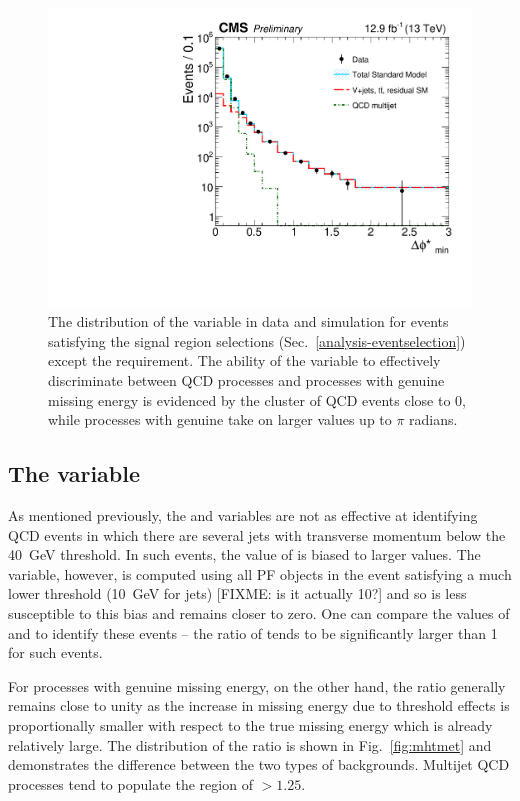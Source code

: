 
\begin{figure}[t!]
\begin{center}
\includegraphics[width=0.7\linewidth]{figs/analysis/propaganda_bdphi}
\caption{The distribution of the \bdphi variable in data and simulation for 
events satisfying the signal region selections 
(Sec.~\ref{analysis-eventselection}) except the \bdphi requirement. The ability 
of the variable to effectively discriminate between QCD processes and processes 
with genuine missing energy is evidenced by the cluster of QCD events close to 
0, while processes with genuine \met take on larger values up to $\pi$ radians.}
\label{fig:bdphi}
\end{center}
\end{figure}

\subsection{The \mhtmet variable}

As mentioned previously, the \alphat and \bdphi variables are not as effective 
at identifying QCD events in which there are several jets with transverse 
momentum below the 40~GeV threshold. In such events, the value of \mht is 
biased to larger values. The \met variable, however, is computed using all PF 
objects in the event satisfying a much lower threshold (10~GeV for jets) 
[FIXME: is it actually 10?] and so is less susceptible to this bias and remains 
closer to zero. One can compare the values of \mht and \met to identify these 
events -- the ratio of \mhtmet tends to be significantly larger than 1 for such 
events. 

For processes with genuine missing energy, on the other hand, the ratio 
generally remains close to unity as the increase in missing energy due to 
threshold effects is proportionally smaller with respect to the true missing 
energy which is already relatively large. The distribution of the \mhtmet 
ratio is shown in Fig.~\ref{fig:mhtmet} and demonstrates the difference between 
the two types of backgrounds. Multijet QCD processes tend to populate the 
region of \mhtmet$>1.25$.

